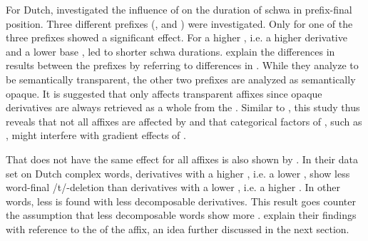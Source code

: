 {{ For Dutch, \cite{Hanique.2011} investigated the influence of  on the duration of schwa in prefix-final position. Three different prefixes (,  and ) were investigated. Only for one of the three prefixes  showed a significant effect. For  a higher , i.e. a higher derivative  and a lower base , led to shorter schwa durations.
 \cite{Hanique.2011} explain the differences in results between the prefixes by referring to differences in . While they analyze  to be semantically transparent, the other two prefixes are analyzed as semantically opaque. It is suggested that  only affects transparent affixes since opaque derivatives are always  retrieved as a whole from the . Similar to \cite{Collie.2008}, this study thus reveals that not all affixes are affected by  and that categorical factors of , such as , might interfere with gradient effects of . 


That  does not have the same effect for all affixes is also shown by \cite{Schuppler.2012}. In their data set on Dutch complex words, derivatives with a higher , i.e. a lower , show less word-final /t/-deletion than derivatives with a lower , i.e. a higher . In other words, less  is found with less decomposable derivatives. This result goes counter the assumption that less decomposable words show more . \cite{Schuppler.2012} explain their findings with reference to the  of the affix, an idea further discussed in the next section.

}}
